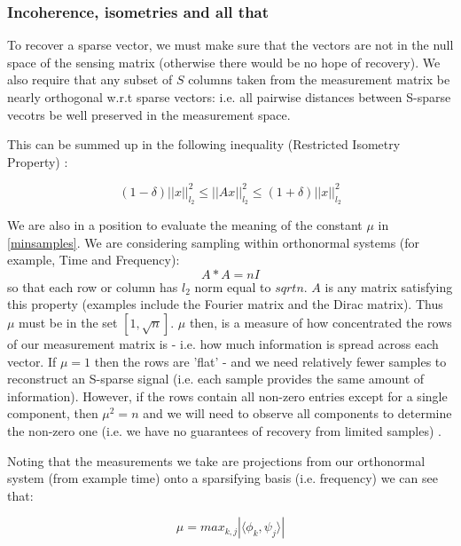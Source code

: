 \documentclass[conference]{IEEEtran}
\newcommand{\vectornorm}[1]{\left|\left|#1\right|\right|}
\begin{document}
\subsubsection{Incoherence, isometries and all that}
To recover a sparse vector, we must make sure that the vectors are not in the null space of the sensing matrix (otherwise there would be no hope of recovery). We also require that any subset of \(S\) columns taken from the measurement matrix be nearly orthogonal w.r.t sparse vectors: i.e. all pairwise distances between S-sparse vecotrs be well preserved in the measurement space.

This can be summed up in the following inequality (Restricted Isometry Property) \cite{Emma}:

\begin{equation}
\left(1-\delta\right)\vectornorm{x}_{l_2}^2 \leq \vectornorm{Ax}_{l_2}^2 \leq \left(1+\delta\right) \vectornorm{x}_{l_2}^2
\end{equation}
\label{RIP}

We are also in a position to evaluate the meaning of the constant \(\mu\) in \ref{minsamples}. We are considering sampling within orthonormal systems (for example, Time and Frequency):
%
\begin{equation}
A*A = nI
\end{equation}
\label{orthonormal}
%
so that each row or column has \(l_2\) norm equal to \(sqrt{n}\). \(A\) is any matrix satisfying this property (examples include the Fourier matrix and the Dirac matrix). Thus \(\mu\) must be in the set \(\left[1, \sqrt{n}\right]\). \(\mu\) then, is a measure of how concentrated the rows of our measurement matrix is - i.e. how much information is spread across each vector. If \(\mu = 1\) then the rows are 'flat' -  and we need relatively fewer samples to reconstruct an S-sparse signal (i.e. each sample provides the same amount of information). However, if the rows contain all non-zero entries except for a single component, then \(\mu^2 = n\) and we will need to observe all components to determine the non-zero one (i.e. we have no guarantees of recovery from limited samples) \cite{Candes2007}. 

Noting that the measurements we take are projections from our orthonormal system (from example time) onto a sparsifying basis (i.e. frequency) we can see that:

\begin{equation}
\mu = max_{k,j} |\langle \phi_k, \psi_j \rangle |
\end{equation}
\label {mudef}
 
\end{document}
